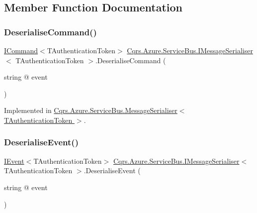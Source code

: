 \subsection{Member Function Documentation}
\mbox{\label{interfaceCqrs_1_1Azure_1_1ServiceBus_1_1IMessageSerialiser_aade6efce33aae849c4c6ed1e24211ecc_aade6efce33aae849c4c6ed1e24211ecc}} 
\subsubsection{\texorpdfstring{Deserialise\+Command()}{DeserialiseCommand()}}
{\footnotesize\ttfamily \hyperlink{interfaceCqrs_1_1Commands_1_1ICommand}{I\+Command}$<$T\+Authentication\+Token$>$ \hyperlink{interfaceCqrs_1_1Azure_1_1ServiceBus_1_1IMessageSerialiser}{Cqrs.\+Azure.\+Service\+Bus.\+I\+Message\+Serialiser}$<$ T\+Authentication\+Token $>$.Deserialise\+Command (\begin{DoxyParamCaption}\item[{string @}]{event }\end{DoxyParamCaption})}



Implemented in \hyperlink{classCqrs_1_1Azure_1_1ServiceBus_1_1MessageSerialiser_a7cbab381f4758f8dd04cd17e2c5f2c3a_a7cbab381f4758f8dd04cd17e2c5f2c3a}{Cqrs.\+Azure.\+Service\+Bus.\+Message\+Serialiser$<$ T\+Authentication\+Token $>$}.

\mbox{\label{interfaceCqrs_1_1Azure_1_1ServiceBus_1_1IMessageSerialiser_ab65c6e4a8c2a660ceb2236ee11fd33f6_ab65c6e4a8c2a660ceb2236ee11fd33f6}} 
\subsubsection{\texorpdfstring{Deserialise\+Event()}{DeserialiseEvent()}}
{\footnotesize\ttfamily \hyperlink{interfaceCqrs_1_1Events_1_1IEvent}{I\+Event}$<$T\+Authentication\+Token$>$ \hyperlink{interfaceCqrs_1_1Azure_1_1ServiceBus_1_1IMessageSerialiser}{Cqrs.\+Azure.\+Service\+Bus.\+I\+Message\+Serialiser}$<$ T\+Authentication\+Token $>$.Deserialise\+Event (\begin{DoxyParamCaption}\item[{string @}]{event }\end{DoxyParamCaption})}



